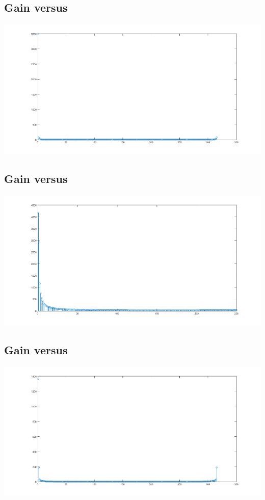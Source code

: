 \documentclass[12pt]{article}
\begin{document}
\subsection*{Gain versus }
\begin{center}
    \includegraphics{stem1.png}
\end{center}

\subsection*{Gain versus }
\begin{center}
    \includegraphics{stem2.png}
\end{center}

\subsection*{Gain versus }
\begin{center}
    \includegraphics{stem3.png}
\end{center}
\end{document}
